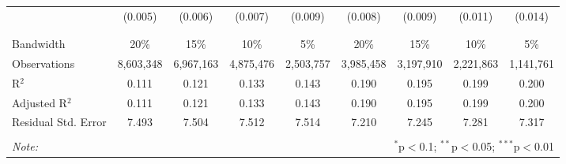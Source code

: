 \begin{table}[!htbp]
\begin{adjustbox}{scale = 0.9}
\begin{tabular}{@{\extracolsep{5pt}}lcccccccc}
  & (0.005) & (0.006) & (0.007) & (0.009) & (0.008) & (0.009) & (0.011) & (0.014) \\ 
  & & & & & & & & \\ 
\hline \\[-1.8ex] 
Bandwidth & 20\% & 15\% & 10\% & 5\% & 20\% & 15\% & 10\% & 5\% \\ 
Observations & 8,603,348 & 6,967,163 & 4,875,476 & 2,503,757 & 3,985,458 & 3,197,910 & 2,221,863 & 1,141,761 \\ 
R$^{2}$ & 0.111 & 0.121 & 0.133 & 0.143 & 0.190 & 0.195 & 0.199 & 0.200 \\ 
Adjusted R$^{2}$ & 0.111 & 0.121 & 0.133 & 0.143 & 0.190 & 0.195 & 0.199 & 0.200 \\ 
Residual Std. Error & 7.493 & 7.504 & 7.512 & 7.514 & 7.210 & 7.245 & 7.281 & 7.317 \\ 
\hline 
\hline \\[-1.8ex] 
\textit{Note:}  & \multicolumn{8}{r}{$^{*}$p$<$0.1; $^{**}$p$<$0.05; $^{***}$p$<$0.01} \\ 
\end{tabular}

\end{adjustbox}

\end{table}